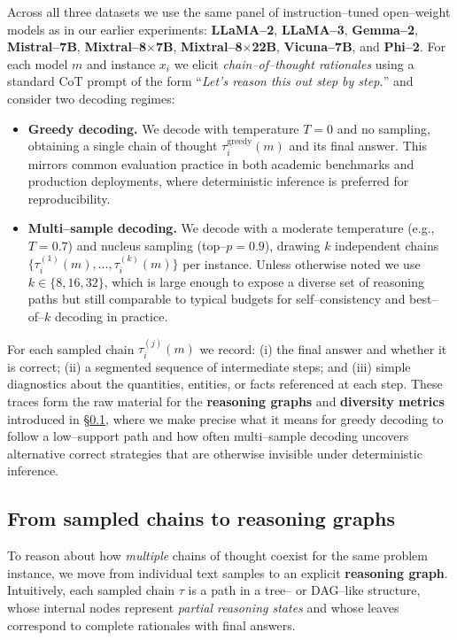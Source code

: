 Across all three datasets we use the same panel of instruction--tuned
open--weight models as in our earlier experiments:
\textbf{LLaMA--2}, \textbf{LLaMA--3}, \textbf{Gemma--2},
\textbf{Mistral--7B}, \textbf{Mixtral--8$\times$7B},
\textbf{Mixtral--8$\times$22B}, \textbf{Vicuna--7B}, and
\textbf{Phi--2}.
For each model $m$ and instance $x_i$ we elicit \emph{chain--of--thought
rationales} using a standard CoT prompt of the form
``\emph{Let's reason this out step by step.}'' and consider two
decoding regimes:

\begin{itemize}[leftmargin=1.5em]
  \item \textbf{Greedy decoding.}
  We decode with temperature $T{=}0$ and no sampling, obtaining a single
  chain of thought $\tau_i^{\mathrm{greedy}}(m)$ and its final answer.
  This mirrors common evaluation practice in both academic benchmarks
  and production deployments, where deterministic inference is preferred
  for reproducibility.

  \item \textbf{Multi--sample decoding.}
  We decode with a moderate temperature (e.g., $T{=}0.7$) and nucleus
  sampling (top--$p{=}0.9$), drawing $k$ independent chains
  $\{\tau_i^{(1)}(m), \dots, \tau_i^{(k)}(m)\}$ per instance.
  Unless otherwise noted we use $k{\in}\{8,16,32\}$, which is large
  enough to expose a diverse set of reasoning paths but still comparable
  to typical budgets for self--consistency and best--of--$k$ decoding in
  practice.
\end{itemize}

For each sampled chain $\tau_i^{(j)}(m)$ we record:
(i) the final answer and whether it is correct;
(ii) a segmented sequence of intermediate steps; and
(iii) simple diagnostics about the quantities, entities, or facts
referenced at each step.
These traces form the raw material for the \textbf{reasoning graphs} and
\textbf{diversity metrics} introduced in
\S\ref{subsec:reasoning-graphs}, where we make precise what it means
for greedy decoding to follow a low--support path and how often
multi--sample decoding uncovers alternative correct strategies that are
otherwise invisible under deterministic inference.

\subsection{From sampled chains to reasoning graphs}
\label{subsec:reasoning-graphs}

To reason about how \emph{multiple} chains of thought coexist for the
same problem instance, we move from individual text samples to an
explicit \textbf{reasoning graph}.
Intuitively, each sampled chain $\tau$ is a path in a tree-- or
DAG--like structure, whose internal nodes represent \emph{partial
reasoning states} and whose leaves correspond to complete rationales
with final answers.

